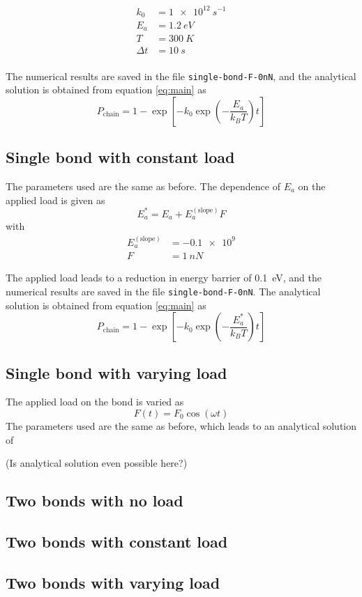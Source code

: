 \documentclass[letterpaper]{article}
\begin{document}
\begin{align*}
  k_0 &= \SI{1e12}{s^{-1}}\\
  E_a &= \SI{1.2 }{eV}\\
  T   &= \SI{300}{K}\\
  \Delta t &= \SI{10}{s}\\
\end{align*}

The numerical results are saved in the file \texttt{single-bond-F-0nN}, and the analytical solution is obtained from equation \ref{eq:main} as
\begin{equation}
  P_\mathrm{chain} = 1-\exp[-k_0\exp(-\frac{E_a}{k_B T})t]
\end{equation}



\subsection{Single bond with constant load}
The parameters used are the same as before. The dependence of $E_a$ on the applied load is given as
\[
E_a^* = E_a + E_a^\mathrm{(slope)}F
\]
with
\begin{align*}
  E_a^\mathrm{(slope)} &= \num{-0.1e9}\\
  F &= \SI{1}{nN}
\end{align*}

The applied load leads to a reduction in energy barrier of \SI{0.1}{eV}, and the numerical results are saved in the file \texttt{single-bond-F-0nN}. The analytical solution is obtained from equation \ref{eq:main} as
\[
P_\mathrm{chain} = 1-\exp[-k_0\exp(-\frac{E_a^*}{k_B T})t]
\]

\subsection{Single bond with varying load}
The applied load on the bond is varied as
\[
F(t) = F_0 \cos(\omega t)
\]
The parameters used are the same as before, which leads to an analytical solution of

(Is analytical solution even possible here?)


\subsection{Two bonds with no load}
\subsection{Two bonds with constant load}
\subsection{Two bonds with varying load}
\end{document}
